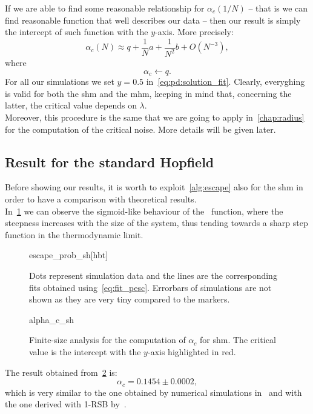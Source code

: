 \documentclass[\rootdir/main.tex]{subfiles}
\begin{document}
 If we are able to find some reasonable relationship for $\alpha_c(1/N)$ -- that is we can find reasonable function that well describes our data -- then our result is simply the intercept of such function with the $y$-axis. More precisely:
 \begin{equation}\label{eq:scaling_alpha}
    \alpha_c(N) \approx q + \frac{1}{N}a + \frac{1}{N^2} b + O\left(N^{-3}\right),
\end{equation}
where
\begin{equation*}
    \alpha_c \gets q.
\end{equation*}
For all our simulations we set $y = 0.5$ in~\cref{eq:pd:solution_fit}. Clearly, everyghing is valid for both the \acrlong{shm} and the \acrlong{mhm}, keeping in mind that, concerning the latter, the critical value depends on $\lambda$.\\
Moreover, this procedure is the same that we are going to apply in~\cref{chap:radius} for the computation of the critical noise. More details will be given later.

\subsection{Result for the standard Hopfield}
Before showing our results, it is worth to exploit~\cref{alg:escape} also for the \acrlong{shm} in order to have a comparison with theoretical results.\\
In~\cref{fig:sh:escape_probs} we can observe the sigmoid-like behaviour of the \pesc\ function, where the steepness increases with the size of the system, thus tending towards a sharp step function in the thermodynamic limit.
\begin{figure}[hbt]
    \centering
    {escape_prob_sh}[hbt]
    \caption{Dots represent simulation data and the lines are the corresponding fits obtained using~\cref{eq:fit_pesc}. Errorbars of simulations are not shown as they are very tiny compared to the markers.}
    \label{fig:sh:escape_probs}
\end{figure}
\begin{figure}[hbt]
    \centering
    {alpha_c_sh}
    \caption{Finite-size analysis for the computation of $\alpha_c$ for \acrshort{shm}. The critical value is the intercept with the $y$-axis highlighted in red.}
    \label{fig:sh:critical_alpha}
\end{figure}
The result obtained from~\cref{fig:sh:critical_alpha} is:
\begin{equation}
    \alpha_c = 0.1454 \pm 0.0002,
\end{equation}
which is very similar to the one obtained by numerical simulations in~\cite{amit_phase, another_mc_study} and with the one derived with 1-RSB by~\textcite{Crisanti}.
\end{document}
